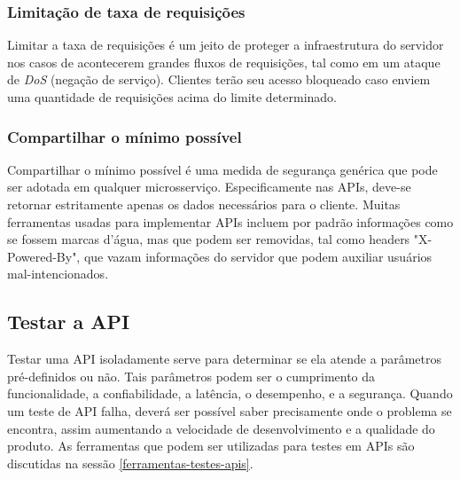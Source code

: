 
\subsubsection*{Limitação de taxa de requisições}
Limitar a taxa de requisições é um jeito de proteger a infraestrutura do servidor nos casos de acontecerem grandes fluxos de requisições, tal como em um ataque de \emph{DoS} (negação de serviço). Clientes terão seu acesso bloqueado caso enviem uma quantidade de requisições acima do limite determinado. \cite{rapidAPI-twitter}

\subsubsection*{Compartilhar o mínimo possível}
Compartilhar o mínimo possível é uma medida de segurança genérica que pode ser adotada em qualquer microsserviço. Especificamente nas APIs, deve-se retornar estritamente apenas os dados necessários para o cliente. Muitas ferramentas usadas para implementar APIs incluem por padrão informações como se fossem marcas d'água, mas que podem ser removidas, tal como headers "X-Powered-By", que vazam informações do servidor que podem auxiliar usuários mal-intencionados. \cite{rapidAPI-twitter}

\subsection{Testar a API}
Testar uma API isoladamente serve para determinar se ela atende a parâmetros pré-definidos ou não. Tais parâmetros podem ser o cumprimento da funcionalidade, a confiabilidade, a latência, o desempenho, e a segurança. Quando um teste de API falha, deverá ser possível saber precisamente onde o problema se encontra, assim aumentando a velocidade de desenvolvimento e a qualidade do produto. As ferramentas que podem ser utilizadas para testes em APIs são discutidas na sessão \autoref{ferramentas-testes-apis}.


